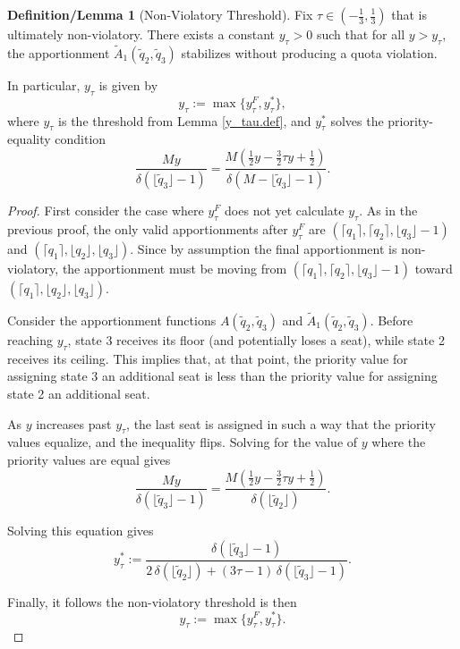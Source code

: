 \documentclass[11pt]{article}
\theoremstyle{definition}
\newtheorem{deflem}[theorem]{Definition/Lemma}
\theoremstyle{definition}
\begin{document}
\begin{deflem}[Non-Violatory Threshold]\label{y_tau.def2}
Fix $\tau \in (-\frac{1}{3},\frac{1}{3})$ that is ultimately non-violatory. 
There exists a constant $y_\tau > 0$ such that for all $y > y_\tau$, the apportionment $\tilde A_1(\tilde q_2, \tilde q_3)$ stabilizes without producing a quota violation. 

In particular, $y_\tau$ is given by
$$y_\tau := \max\{y_\tau^F, y_\tau^*\},$$
where $y_\tau$ is the threshold from Lemma \ref{y_tau.def}, and $y_\tau^*$ solves the priority-equality condition
$$
\frac{M y}{\delta(\lfloor \tilde q_3 \rfloor-1)} =
\frac{M\left(\frac{1}{2} y - \frac{3}{2} \tau y + \frac{1}{2}\right)}{\delta(M - \lfloor \tilde q_3 \rfloor - 1)}.
$$
\end{deflem}
\begin{proof}
First consider the case where $y_\tau^F$ does not yet calculate $y_\tau$. As in the previous proof, the only valid apportionments after $y_\tau^F$ are $(\lceil q_1 \rceil, \lceil q_2 \rceil, \lfloor q_3 \rfloor - 1)$ and $(\lceil q_1 \rceil, \lfloor q_2 \rfloor, \lfloor q_3 \rfloor)$.
Since by assumption the final apportionment is non-violatory, the apportionment must be moving from $(\lceil q_1 \rceil, \lceil q_2 \rceil, \lfloor q_3 \rfloor - 1)$ toward $(\lceil q_1 \rceil, \lfloor q_2 \rfloor, \lfloor q_3 \rfloor).$

Consider the apportionment functions $A(\tilde q_2, \tilde q_3)$ and $\tilde A_1(\tilde q_2, \tilde q_3)$. Before reaching $y_\tau$, state 3 receives its floor (and potentially loses a seat), while state 2 receives its ceiling. This implies that, at that point, the priority value for assigning state 3 an additional seat is less than the priority value for assigning state 2 an additional seat. 

As $y$ increases past $y_\tau$, the last seat is assigned in such a way that the priority values equalize, and the inequality flips. Solving for the value of $y$ where the priority values are equal gives
$$
\frac{M y}{\delta(\lfloor \tilde{q}_3 \rfloor-1)} = \frac{M\left(\frac{1}{2} y - \frac{3}{2} \tau y + \frac{1}{2}\right)}{ \delta(\lfloor \tilde q_2 \rfloor)}.$$

Solving this equation gives
$$y_\tau^* := \frac{\delta(\lfloor \tilde{q}_3 \rfloor-1)}{2\,\delta(\lfloor \tilde q_2 \rfloor) + (3\tau - 1)\,\delta(\lfloor \tilde{q}_3 \rfloor-1)}.$$

Finally, it follows the non-violatory threshold is then
$$y_\tau := \max\{y_\tau^F, y_\tau^*\}.$$
\end{proof}
\end{document}
